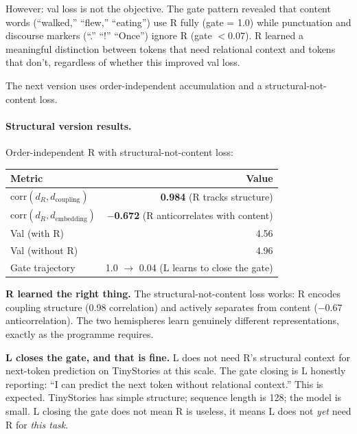 \documentclass[11pt, a4paper]{article}
\theoremstyle{plain}
\theoremstyle{definition}
\theoremstyle{remark}
\begin{document}
However: val loss is not the objective.
The gate pattern revealed that content words (``walked,'' ``flew,'' ``eating'') use R fully (gate = 1.0) while punctuation and discourse markers (``.'' ``!'' ``Once'') ignore R (gate $< 0.07$).
R learned a meaningful distinction between tokens that need relational context and tokens that don't, regardless of whether this improved val loss.

The next version uses order-independent accumulation and a structural-not-content loss.

\paragraph{Structural version results.}
Order-independent R with structural-not-content loss:
\begin{center}\small
\begin{tabular}{lr}
\toprule
\textbf{Metric} & \textbf{Value} \\
\midrule
$\mathrm{corr}(d_R, d_{\mathrm{coupling}})$ & \textbf{0.984} (R tracks structure) \\
$\mathrm{corr}(d_R, d_{\mathrm{embedding}})$ & \textbf{$-$0.672} (R anticorrelates with content) \\
Val (with R) & 4.56 \\
Val (without R) & 4.96 \\
Gate trajectory & 1.0 $\to$ 0.04 (L learns to close the gate) \\
\bottomrule
\end{tabular}
\end{center}

\textbf{R learned the right thing.}
The structural-not-content loss works: R encodes coupling structure (0.98 correlation) and actively separates from content ($-$0.67 anticorrelation).
The two hemispheres learn genuinely different representations, exactly as the programme requires.

\textbf{L closes the gate, and that is fine.}
L does not need R's structural context for next-token prediction on TinyStories at this scale.
The gate closing is L honestly reporting: ``I can predict the next token without relational context.''
This is expected.
TinyStories has simple structure; sequence length is 128; the model is small.
L closing the gate does not mean R is useless, it means L does not \emph{yet} need R for \emph{this task}.
\end{document}
